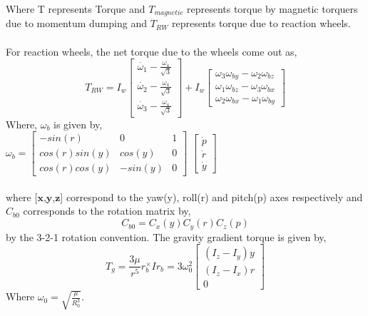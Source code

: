 \documentclass[10pt,a4paper]{report}
\begin{document}
Where T represents Torque and $ T_{magnetic} $ represents torque by magnetic torquers due to momentum dumping and $ T_{RW} $ represents torque due to reaction wheels.
\\
\\
For reaction wheels, the net torque due to the wheels come out as,
\begin{equation}
T_{RW}=I_{w}\begin{bmatrix}
\dot{\omega_{1}}-\frac{\omega_{4}}{\sqrt{3}}\\
\dot{\omega_{2}}-\frac{\omega_{4}}{\sqrt{3}}\\
\dot{\omega_{3}}-\frac{\omega_{4}}{\sqrt{3}}
\end{bmatrix}
+I_{w}\begin{bmatrix}
\omega_{3}\omega_{by}-\omega_{2}\omega_{bz}\\
\omega_{1}\omega_{bz}-\omega_{3}\omega_{bx}\\
\omega_{2}\omega_{bx}-\omega_{1}\omega_{by}
\end{bmatrix}
\end{equation}
Where, $ \omega_{b} $ is given by,\\
$
\omega_{b} =\begin{bmatrix}
-sin(r) & 0 & 1\\
cos(r) sin(y)&cos(y)&0\\
cos(r) cos(y)&-sin(y)&0
\end{bmatrix}
$ $
\begin{bmatrix}
\dot{p}\\ \dot{r} \\ \dot{y}
\end{bmatrix}
 $\\ \\
where [$\textbf{x}$,$\textbf{y}$,$\textbf{z}$]  correspond to the yaw(y), roll(r) and pitch(p) axes respectively and $ C_{b0} $ corresponds to the rotation matrix by,
\begin{equation}
C_{b0}=C_{x}(y)C_{y}(r)C_{z}(p)
\end{equation}
by the 3-2-1 rotation convention.
\newpage
The gravity gradient torque is given by,
\begin{equation}
T_{g}=\frac{3\mu}{r^{5}}r_{b}^{\times}Ir_{b}=3\omega_{0}^{2}\begin{bmatrix}
(I_{z}-I_{y})y\\(I_{z}-I_{x})r \\0
\end{bmatrix}
\end{equation}
Where $ \omega_{0} =\sqrt{\frac{\mu}{R_{0}^{3}}}$.
\end{document}
